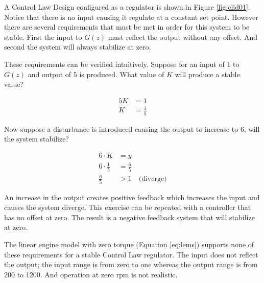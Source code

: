 \documentclass{article}
\begin{document}
A Control Law Design\autocite[Pg. 280]{franklin1998digital} configured
as a regulator is shown in Figure \ref{fig:clid01}.
Notice that there is no input causing it regulate at a constant set point.
However there are several requirements that must be met in order
for this system to be stable.
First the input to $G(z)$ must reflect the output without any offset.
And second the system will always stabilize at zero.

These requirements can be verified intuitively.
Suppose for an input of $1$ to $G(z)$ and output of $5$ is produced.
What value of $K$ will produce a stable value?

\begin{align*}
	5 K &= 1 \\
	K &= \frac{1}{5}
\end{align*}

Now suppose a disturbance is introduced causing the output to increase
to $6$, will the system stabilize?

\begin{align*}
	6 \cdot K &= y \\
	6 \cdot \frac{1}{5} &= \frac{6}{5} \\
	\frac{6}{5} &> 1 \quad \text{(diverge)}
\end{align*}

An increase in the output creates positive feedback which increases
the input and causes the system diverge.
This exercise can be repeated with a controller that has no offset at zero.
The result is a negative feedback system that will stabilize at zero.

The linear engine model with zero torque (Equation \ref{eq:lems})
supports none of these requirements for a stable Control Law regulator.
The input does not reflect the output; the input range is from zero to
one whereas the output range is from 200 to 1200.
And operation at zero rpm is not realistic.
\end{document}

